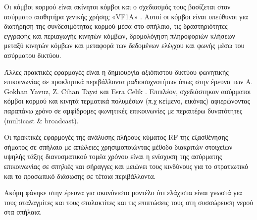 \documentclass[12pt]{article}
\begin{document}
\begin{multicols*}{2}
        Οι κόμβοι κορμού είναι ακίνητοι
        κόμβοι και ο σχεδιασμός τους βασίζεται στον ασύρματο αισθητήρα γενικής
        χρήσης «VF1A» \cite{walsh_communications_2018}.
        Αυτοί οι κόμβοι είναι υπεύθυνοι για διατήρηση της συνδεσιμότητας κορμού μέσα 
        στο σπήλαιο, τις δραστηριότητες
        εγγραφής και περιαγωγής κινητών κόμβων, δρομολόγηση πληροφοριών κλήσεων μεταξύ
        κινητών κόμβων και μεταφορά των δεδομένων ελέγχου και φωνής μέσω του ασύρματου
        δικτύου.

        Άλλες πρακτικές εφαρμογές είναι η δημιουργία αξιόπιστου δικτύου φωνητικής επικοινωνίας
        σε προκλητικά περιβάλλοντα ραδιοσυχνοτήτων όπως στην έρευνα των A. Gokhan Yavuz, 
        Z. Cihan Taysi και Esra Celik \cite{yavuz_-cave_2009}. Επιπλέον, σχεδιάστηκαν
        ασύρματοι κόμβοι κορμού και κινητά τερματικά πολυμέσων (π.χ κείμενο, εικόνας) 
        αφιερώνοντας παραπάνω χρόνο σε αμφίδρομες φωνητικές επικοινωνίες με περαιτέρω
        δυνατότητες (multicast \& broadcast).

        Οι πρακτικές εφαρμογές της ανάλυσης πλήρους κύματος RF της εξασθένησης σήματος σε σπήλαιο
        με απώλειες χρησιμοποιώντας μέθοδο διακριτών στοιχείων υψηλής τάξης διανυσματικού τομέα
        χρόνου \cite{pingenot_full_2005} είναι η ενίσχυση της ασύρματης επικοινωνίας σε σπηλιές
        και σήραγγες και μειώνει τους κινδύνους για το στρατιωτικό και το προσωπικό διάσωσης σε τέτοια
        περιβάλλοντα.

        Ακόμη φάνηκε στην έρευνα για ακανόνιστο μοντέλο \cite{soo_measurement_2019} ότι ελάχιστα
        είναι γνωστά για τους σταλαγμίτες και τους σταλακτίτες και τις επιπτώσεις τους στη 
        συσσώρευση νερού στα σπήλαια.
\end{multicols*}
\end{document}
